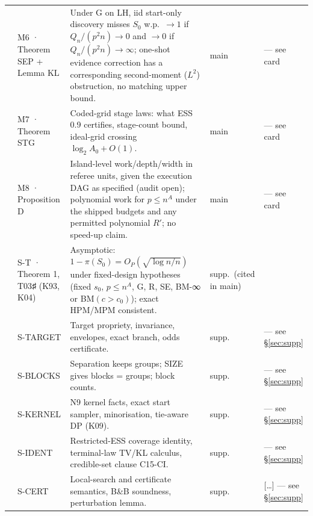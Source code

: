 {\begin{xltabular}{\linewidth}{@{}p{1.15cm}p{2.9cm}X p{1.25cm}p{4.6cm}@{}}
 & M6 · Theorem SEP + Lemma KL & Under G on LH, iid start-only discovery misses $S_0$ w.p.\ $\to1$ if $Q_n/(p^2n)\to0$ and $\to0$ if $Q_n/(p^2n)\to\infty$; one-shot evidence correction has a corresponding second-moment ($L^2$) obstruction, no matching upper bound. & main &  — see card \\
 & M7 · Theorem STG & Coded-grid stage laws: what ESS 0.9 certifies, stage-count bound, ideal-grid crossing $\log_2 A_0+O(1)$. & main &  — see card \\
 & M8 · Proposition D & Island-level work/depth/width in referee units, given the execution DAG as specified (audit open); polynomial work for $p\le n^A$ under the shipped budgets and any permitted polynomial $R'$; no speed-up claim. & main &  — see card \\
 & S-T · Theorem 1, T03♯ (K93, K04) & Asymptotic: $1-\pi(S_0)=O_P(\sqrt{\log n/n})$ under fixed-design hypotheses (fixed $s_0$, $p\le n^A$, G, R, SE, BM-∞ or BM$(c>c_0)$); exact HPM/MPM consistent. & supp.\ (cited in main) &  \\
 & S-TARGET & Target propriety, invariance, envelopes, exact branch, odds certificate. & supp. &  — see §\ref{sec:supp} \\
 & S-BLOCKS & Separation keeps groups; SIZE gives blocks = groups; block counts. & supp. &  — see §\ref{sec:supp} \\
 & S-KERNEL & N9 kernel facts, exact start sampler, minorisation, tie-aware DP (K09). & supp. &  — see §\ref{sec:supp} \\
 & S-IDENT & Restricted-ESS coverage identity, terminal-law TV/KL calculus, credible-set clause C15-CI. & supp. &  — see §\ref{sec:supp} \\
 & S-CERT & Local-search and certificate semantics, B\&B soundness, perturbation lemma. & supp. &  [\ldots] — see §\ref{sec:supp} \\

\end{xltabular}}
